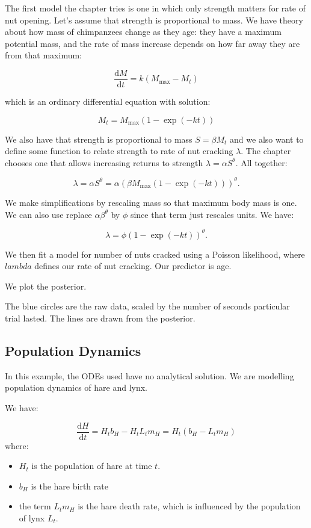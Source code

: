 \documentclass[
]{book}
\providecommand{\tightlist}{%
  \setlength{\itemsep}{0pt}\setlength{\parskip}{0pt}}
\begin{document}
The first model the chapter tries is one in which only strength matters for rate of nut opening. Let's assume that strength is proportional to mass. We have theory about how mass of chimpanzees change as they age: they have a maximum potential mass, and the rate of mass increase depends on how far away they are from that maximum:

\[
\frac{\text{d}M}{\text{d}t} = k (M_\text{max} - M_t)
\]

which is an ordinary differential equation with solution:

\[
M_t = M_\text{max}(1- \exp(-kt))
\]

We also have that strength is proportional to mass \(S = \beta M_t\) and we also want to define some function to relate strength to rate of nut cracking \(\lambda\). The chapter chooses one that allows increasing returns to strength \(\lambda = \alpha S^\theta\). All together:

\[
\lambda = \alpha S^\theta = \alpha (\beta M_\text{max}(1- \exp(-kt)))^\theta.
\]

We make simplifications by rescaling mass so that maximum body mass is one. We can also use replace \(\alpha \beta^\theta\) by \(\phi\) since that term just rescales units. We have:

\[
\lambda = \phi (1- \exp(-kt))^\theta.
\]

We then fit a model for number of nuts cracked using a Poisson likelihood, where \(lambda\) defines our rate of nut cracking. Our predictor is age.

We plot the posterior.

The blue circles are the raw data, scaled by the number of seconds particular trial lasted. The lines are drawn from the posterior.

\hypertarget{population-dynamics}{%
\subsection*{Population Dynamics}\label{population-dynamics}}

In this example, the ODEs used have no analytical solution. We are modelling population dynamics of hare and lynx.

We have:

\[
\frac{\text{d}H}{\text{d}t} = H_t b_H - H_t L_t m_H = H_t (b_H - L_t m_H)
\]
where:

\begin{itemize}
\tightlist
\item
  \(H_t\) is the population of hare at time \(t\).
\item
  \(b_H\) is the hare birth rate
\item
  the term \(L_t m_H\) is the hare death rate, which is influenced by the population of lynx \(L_t\).
\end{itemize}
\end{document}
